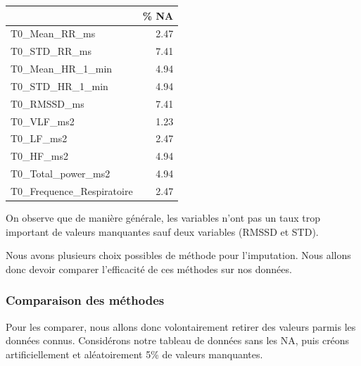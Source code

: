 \documentclass[]{article}
\begin{document}
\begin{table}[H]
\centering
\begin{tabular}{l|r}
\hline
  & \% NA\\
\hline
T0\_Mean\_RR\_ms & 2.47\\
\hline
T0\_STD\_RR\_ms & 7.41\\
\hline
T0\_Mean\_HR\_1\_min & 4.94\\
\hline
T0\_STD\_HR\_1\_min & 4.94\\
\hline
T0\_RMSSD\_ms & 7.41\\
\hline
T0\_VLF\_ms2 & 1.23\\
\hline
T0\_LF\_ms2 & 2.47\\
\hline
T0\_HF\_ms2 & 4.94\\
\hline
T0\_Total\_power\_ms2 & 4.94\\
\hline
T0\_Frequence\_Respiratoire & 2.47\\
\hline
\end{tabular}
\end{table}

On observe que de manière générale, les variables n'ont pas un taux trop
important de valeurs manquantes sauf deux variables (RMSSD et STD).

Nous avons plusieurs choix possibles de méthode pour l'imputation. Nous
allons donc devoir comparer l'efficacité de ces méthodes sur nos
données.

\hypertarget{comparaison-des-muxe9thodes}{%
\subsubsection{Comparaison des
méthodes}\label{comparaison-des-muxe9thodes}}

Pour les comparer, nous allons donc volontairement retirer des valeurs
parmis les données connus. Considérons notre tableau de données sans les
NA, puis créons artificiellement et aléatoirement 5\% de valeurs
manquantes.
\end{document}
